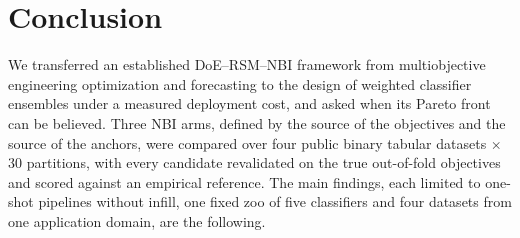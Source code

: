 \section{Conclusion}
\label{sec:conclusion}

We transferred an established DoE--RSM--NBI framework from multiobjective engineering optimization and forecasting to
the design of weighted classifier ensembles under a measured deployment cost, and asked when its Pareto front can be
believed. Three NBI arms, defined by the source of the objectives and the source of the anchors, were compared over
four public binary tabular datasets $\times$ 30 partitions, with every candidate revalidated on the true out-of-fold
objectives and scored against an empirical reference. The main findings, each limited to one-shot pipelines without
infill, one fixed zoo of five classifiers and four datasets from one application domain, are the following.

